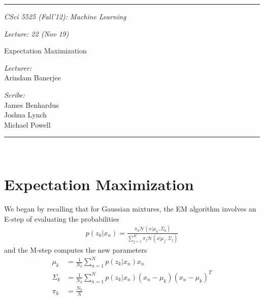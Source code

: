 \documentclass[11pt]{article}
\newcommand{\HRule}{\rule{\linewidth}{0.5mm}}
\begin{document}
\HRule
\begin{center}
\begin{minipage}{0.5\textwidth}
\begin{flushleft} \large
\emph{CSci 5525 (Fall'12): Machine Learning}
\end{flushleft}
\end{minipage}
\hspace*{13mm}
\begin{minipage}{0.4\textwidth}
\begin{flushright} \large
\emph{Lecture: 22 (Nov 19)}
\end{flushright}
\end{minipage}
\vspace*{5mm}

{\LARGE Expectation Maximization}\\
\vspace*{5mm}

\begin{minipage}{0.4\textwidth}
\begin{flushleft} \large
\emph{Lecturer:}\\ 
Arindam Banerjee
\end{flushleft}
\end{minipage}
\hspace*{25mm}
\begin{minipage}{0.4\textwidth}
\begin{flushright} \large
\emph{Scribe:} \\
James Benhardus\\
Joshua Lynch\\
Michael Powell
\end{flushright}
\end{minipage}

\end{center}
\HRule\\

\section{Expectation Maximization}

We began by recalling that for Gaussian mixtures, the EM algorithm involves an E-step of evaluating the probabilities 
\begin{align*}
p(z_{k}|x_{n}) = \frac{\pi_{k}\mathcal{N}(x|\mu_{k},\Sigma_{k})}{\sum_{j=1}^{K}\pi_{j}\mathcal{N}(x|\mu_{j},\Sigma_j)}
\end{align*}
and the M-step computes the new parameters 
\begin{align*}
\mu_k &= \frac{1}{N_{k}}\sum_{n=1}^{N}{p(z_{k}|x_{n})x_{n}} \\
\Sigma_{k} &= \frac{1}{N_{k}}\sum_{n=1}^{N}{p(z_{k}|x_{n})(x_{n}-\mu_{k})(x_{n}-\mu_{k})^{T}} \\
\pi_{k} &= \frac{N_{k}}{N}
\end{align*}
\end{document}
